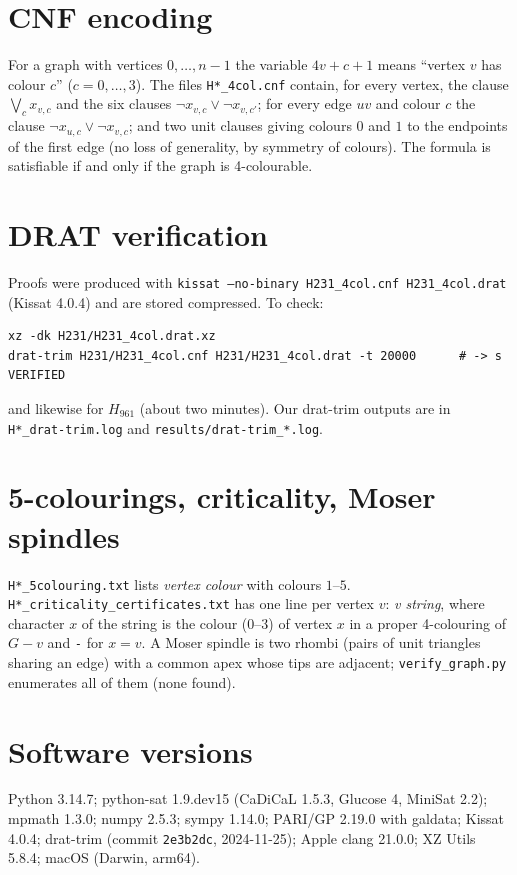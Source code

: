\documentclass[10pt]{article}
\begin{document}
\section{CNF encoding}
For a graph with vertices $0,\dots,n-1$ the variable $4v+c+1$ means ``vertex $v$ has colour $c$''
($c=0,\dots,3$). The files \texttt{H*\_4col.cnf} contain, for every vertex, the clause
$\bigvee_c x_{v,c}$ and the six clauses $\neg x_{v,c}\vee\neg x_{v,c'}$; for every edge $uv$ and colour
$c$ the clause $\neg x_{u,c}\vee\neg x_{v,c}$; and two unit clauses giving colours $0$ and $1$ to the
endpoints of the first edge (no loss of generality, by symmetry of colours). The formula is satisfiable if
and only if the graph is 4-colourable.

\section{DRAT verification}
Proofs were produced with \texttt{kissat --no-binary H231\_4col.cnf H231\_4col.drat} (Kissat 4.0.4) and
are stored compressed. To check:
\begin{verbatim}
xz -dk H231/H231_4col.drat.xz
drat-trim H231/H231_4col.cnf H231/H231_4col.drat -t 20000      # -> s VERIFIED
\end{verbatim}
and likewise for $H_{961}$ (about two minutes). Our drat-trim outputs are in
\texttt{H*\_drat-trim.log} and \texttt{results/drat-trim\_*.log}.

\section{5-colourings, criticality, Moser spindles}
\texttt{H*\_5colouring.txt} lists \emph{vertex colour} with colours $1$--$5$.
\texttt{H*\_criticality\_certificates.txt} has one line per vertex $v$: \emph{v string}, where character
$x$ of the string is the colour ($0$--$3$) of vertex $x$ in a proper 4-colouring of $G-v$ and
\texttt{-} for $x=v$. A Moser spindle is two rhombi (pairs of unit triangles sharing an edge) with a common
apex whose tips are adjacent; \texttt{verify\_graph.py} enumerates all of them (none found).

\section{Software versions}
Python 3.14.7; python-sat 1.9.dev15 (CaDiCaL 1.5.3, Glucose 4, MiniSat 2.2); mpmath 1.3.0; numpy 2.5.3;
sympy 1.14.0; PARI/GP 2.19.0 with galdata; Kissat 4.0.4; drat-trim (commit \texttt{2e3b2dc}, 2024-11-25);
Apple clang 21.0.0; XZ Utils 5.8.4; macOS (Darwin, arm64).
\end{document}
